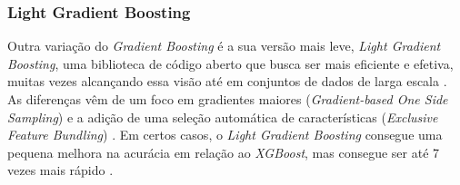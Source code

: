 \subsubsection{Light Gradient Boosting}
\label{subsubsec:contexto-light-gradient-boosting}

Outra variação do \textit{Gradient Boosting} é a sua versão mais leve, \textit{Light Gradient Boosting}, uma biblioteca de código aberto que busca ser mais eficiente e efetiva, muitas vezes alcançando essa visão até em conjuntos de dados de larga escala \cite{lgbm-mastery}. As diferenças vêm de um foco em gradientes maiores (\textit{Gradient-based One Side Sampling}) e a adição de uma seleção automática de características (\textit{Exclusive Feature Bundling}) \cite{lgbm}. Em certos casos, o \textit{Light Gradient Boosting} consegue uma pequena melhora na acurácia em relação ao \textit{XGBoost}, mas consegue ser até 7 vezes mais rápido \cite{lgbmvsxgboost}.





